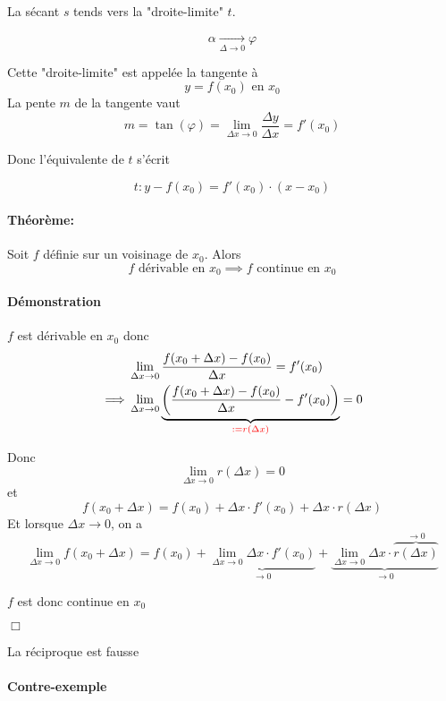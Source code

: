 \documentclass[
    11pt,
    a4paper,
    oneside,
    headinlcude, footinclude,
    twoside,
]{report}
\newcommand{\cqfd}[0]{\begin{flushright}$\Box$\end{flushright}}
\newcommand\Warning{
    \makebox[1.4em][c]{
    \makebox[-5.5pt][c]{\raisebox{.2em}{!}}
    \makebox[0pt][c]{\color{red}\huge$\bigtriangleup$}}
}
\begin{document}
La sécant $s$ tends vers la "droite-limite" $t$.

$$\alpha \xrightarrow[\Delta \to 0]{} \varphi$$

Cette "droite-limite" est appelée la tangente à $$y = f(x_{0}) \text{ en } x_{0}$$
La pente $m$ de la tangente vaut $$m = \tan(\varphi) = \lim_{\Delta x \to 0} \frac{\Delta
y}{\Delta x } = f'(x_{0})$$

Donc l'équivalente de $t$ s'écrit 
\begin{highlightBox}[frametitle={Tangente de $y=f(x)$}]
    $$t: y - f(x_{0}) = f'(x_{0}) \cdot (x - x_{0})$$
\end{highlightBox}

\paragraph{Théorème:}

Soit $f$ définie sur un voisinage de $x_{0}$. Alors $$f \text{ dérivable en }
x_{0} \implies f \text{ continue en } x_{0}$$

\paragraph{Démonstration}
\label{par:demonstration}
$f$ est dérivable en $x_{0}$ donc 
\[
    \begin{split}
        &\lim_{\Delta x \to 0} \frac{f(x_{0} + \Delta x ) - f(x_{0})}{\Delta x } = f'(x_{0})\\
        \implies &\lim_{\Delta x \to 0} \underbrace{\left(\frac{f(x_{0} + \Delta x ) - f(x_{0})}{\Delta x } - f'(x_{0})\right)}_{{\color{red}
    := r(\Delta x)}} = 0\\
    \end{split}
\]

Donc $$\lim_{\Delta x \to 0} r (\Delta x) = 0$$
et $$f(x_{0} + \Delta x) = f(x_{0}) + \Delta x \cdot f'(x_{0}) + \Delta x \cdot
r(\Delta x)$$
Et lorsque $\Delta x \to 0$, on a $$\lim_{\Delta x \to 0} f(x_{0} + \Delta x)
= f(x_{0}) + \underbrace{\lim_{\Delta x \to 0} \Delta x \cdot f'(x_{0})}_{\to 0}+
\underbrace{\lim_{\Delta x \to 0} \Delta x \cdot \overbrace{r(\Delta x)}^{\to 0}}_{\to 0}$$

 $f$ est donc continue en $x_{0}$ \cqfd

\Warning La réciproque est fausse \Warning

\paragraph{Contre-exemple}
\label{par:contre_exemple}
\end{document}
